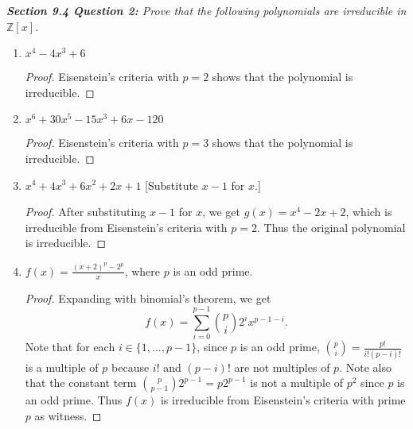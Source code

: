 \documentclass{article}
\begin{document}
\it \textbf{Section 9.4 Question 2:} Prove that the following polynomials
  are irreducible in $\mathbb{Z}[x]$.
  \begin{enumerate}[label={(\alph*)}]
    \item $x^4-4x^3+6$
      \begin{proof}
        Eisenstein's criteria with $p=2$ shows that the polynomial is
        irreducible.
      \end{proof}

    \item $x^6+30x^5-15x^3+6x-120$
      \begin{proof}
        Eisenstein's criteria with $p=3$ shows that the polynomial is
        irreducible.
      \end{proof}

    \item $x^4+4x^3+6x^2+2x+1$ [Substitute $x-1$ for $x$.]
      \begin{proof}
        After substituting $x-1$ for $x$, we get $g(x)=x^4-2x+2$, which is
        irreducible from Eisenstein's criteria with $p=2$. Thus the
        original polynomial is irreducible.
      \end{proof}

    \item $f(x)=\frac{(x+2)^p-2^p}{x}$, where $p$ is an odd prime.
      \begin{proof}
        Expanding with binomial's theorem, we get \[f(x) = \sum_{i=0}^{p-1}
        \binom{p}{i}2^ix^{p-1-i}.\] Note that for each
        $i\in\{1,\ldots,p-1\}$, since $p$ is an odd prime,
        $\binom{p}{i}=\frac{p!}{i!(p-i)!}$ is a multiple of $p$ because
        $i!$ and $(p-i)!$ are not multiples of $p$. Note also that the
        constant term $\binom{p}{p-1}2^{p-1}=p2^{p-1}$ is not a multiple of
        $p^2$ since $p$ is an odd prime. Thus $f(x)$ is irreducible from
        Eisenstein's criteria with prime $p$ as witness.
      \end{proof}
  \end{enumerate}
\end{document}
